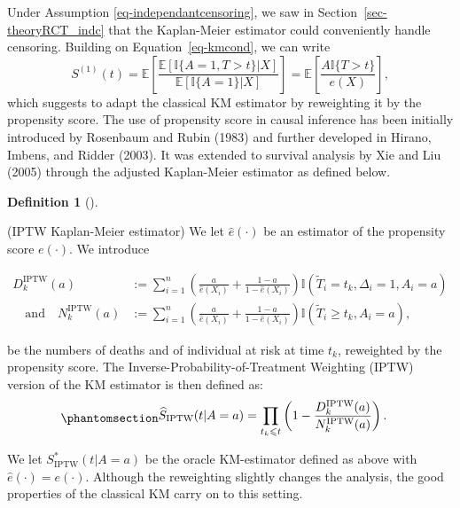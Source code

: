 \documentclass[
  11pt,
  a4paper,
]{article}
\theoremstyle{plain}
\theoremstyle{plain}
\theoremstyle{plain}
\theoremstyle{definition}
\newtheorem{definition}{Definition}[section]
\theoremstyle{remark}
\begin{document}
Under Assumption \ref{eq-independantcensoring}, we saw in
Section~\ref{sec-theoryRCT_indc} that the Kaplan-Meier estimator could
conveniently handle censoring. Building on Equation~\ref{eq-kmcond}, we
can write \[
S^{(1)}(t) = \mathbb{E}\left[\frac{\mathbb{E}[\mathbb{I}\{A=1,T > t\}|X]}{\mathbb{E}[\mathbb{I}\{A=1\}|X]} \right]=\mathbb{E}\left[\frac{A\mathbb{I}\{T > t\}}{e(X)} \right],
\] which suggests to adapt the classical KM estimator by reweighting it
by the propensity score. The use of propensity score in causal inference
has been initially introduced by Rosenbaum and Rubin (1983) and further
developed in Hirano, Imbens, and Ridder (2003). It was extended to
survival analysis by Xie and Liu (2005) through the adjusted
Kaplan-Meier estimator as defined below.

\begin{definition}[]\protect\hypertarget{def-iptwkm}{}\label{def-iptwkm}

(IPTW Kaplan-Meier estimator) We let \(\widehat e(\cdot)\) be an
estimator of the propensity score \(e(\cdot)\). We introduce

\begin{align*}
D_k^{\mathrm{IPTW}}(a) &:= \sum_{i=1}^n \left(\frac{a}{\widehat e(X_i)}+\frac{1-a}{1- \widehat e(X_i)}\right)\mathbb{I}(\widetilde T_i = t_k, \Delta_i = 1, A_i=a) \\
\quad\text{and}\quad N^{\mathrm{IPTW}}_k(a) &:= \sum_{i=1}^n \left(\frac{a}{\widehat e(X_i)}+\frac{1-a}{1- \widehat e(X_i)}\right) \mathbb{I}(\widetilde T_i \geqslant t_k, A_i=a),
\end{align*}

be the numbers of deaths and of individual at risk at time \(t_k\),
reweighted by the propensity score. The Inverse-Probability-of-Treatment
Weighting (IPTW) version of the KM estimator is then defined as:
\begin{equation}\phantomsection\label{eq-IPTWKM}{
\begin{aligned}
\widehat{S}_{\mathrm{IPTW}}(t | A=a) &= \prod_{t_k \leqslant t}\left(1-\frac{D_k^{\mathrm{IPTW}}(a)}{N_k^{\mathrm{IPTW}}(a)}\right). 
\end{aligned}
}\end{equation}

\end{definition}

We let \(S^*_{\mathrm{IPTW}}(t | A=a)\) be the oracle KM-estimator
defined as above with \(\widehat e(\cdot) = e(\cdot)\). Although the
reweighting slightly changes the analysis, the good properties of the
classical KM carry on to this setting.
\end{document}
